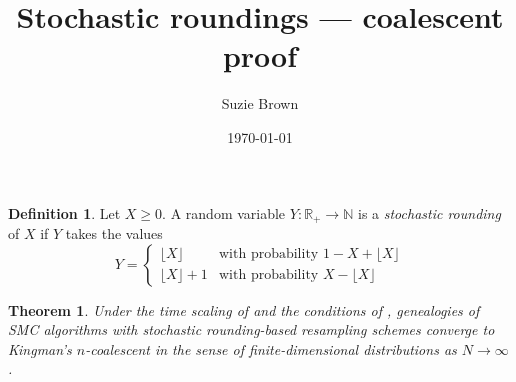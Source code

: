 \documentclass[fleqn]{article}
\title{Stochastic roundings --- coalescent proof}
\author{Suzie Brown}
\date{\today}
\newtheorem{thm}{Theorem}
\theoremstyle{definition}
\newtheorem{defn}{Definition}
\begin{document}
\maketitle
\thispagestyle{fancy}

\begin{defn}\label{defn:randround_1D}
Let $X\geq0$. A random variable $Y: \mathbb{R}_+ \to \mathbb{N}$ is a \emph{stochastic rounding} of $X$ if $Y$ takes the values
\begin{equation*}
Y=
\begin{cases}
 \lfloor X \rfloor & \text{with probability } 1- X+ \lfloor X \rfloor \\
  \lfloor X \rfloor +1 & \text{with probability } X- \lfloor X \rfloor 
\end{cases}
\end{equation*}
\end{defn}

\begin{thm}
Under the time scaling of \citet[Theorem 1]{koskela2018} and the conditions of \citet[Lemma 3]{koskela2018}, genealogies of SMC algorithms with stochastic rounding-based resampling schemes converge to Kingman's $n$-coalescent in the sense of finite-dimensional distributions as $N\to\infty$.
\end{thm}
\end{document}

